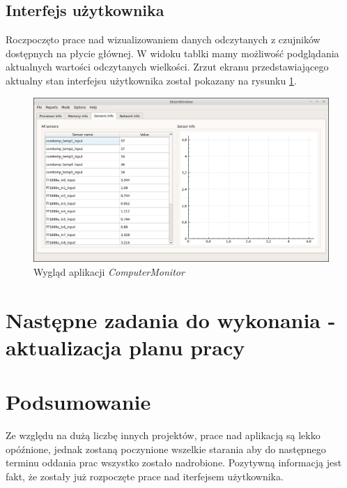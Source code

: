 \documentclass[a4paper]{article}
\begin{document}
\subsection{Interfejs użytkownika}
Roczpoczęto prace nad wizualizowaniem danych  odczytanych z czujników dostępnych na płycie głównej.
W widoku tablki mamy możliwość podglądania aktualnych wartości odczytanych wielkości. Zrzut ekranu przedstawiającego aktualny stan interfejsu użytkownika został pokazany na rysunku \ref{wygladAplikacji}.

\begin{figure}[h]
	\centering
	\includegraphics[width=\linewidth]{img/wygladAplikacji.png}
	\caption{Wygląd aplikacji \textit{ComputerMonitor}}
	\label{wygladAplikacji}
\end{figure}


\section{Następne zadania do wykonania - aktualizacja planu pracy}


\section{Podsumowanie}
Ze względu na dużą liczbę innych projektów, prace nad aplikacją są lekko opóźnione, jednak zostaną poczynione wszelkie starania aby do następnego terminu oddania prac wszystko zostało nadrobione. 
Pozytywną informacją jest fakt, że zostały już rozpoczęte prace nad iterfejsem użytkownika.
\end{document}

